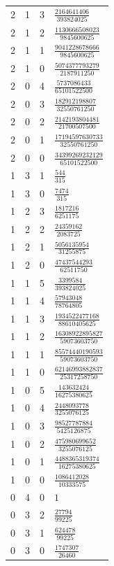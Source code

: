\begin{longtable}{rrrl}
2 & 1 & 3 & $\frac{2164641406}{393824025}$\\
2 & 1 & 2 & $\frac{1130666508023}{9845600625}$\\
2 & 1 & 1 & $\frac{9041228678666}{9845600625}$\\
2 & 1 & 0 & $\frac{5074377793279}{2187911250}$\\
2 & 0 & 4 & $\frac{5737086433}{65101522500}$\\
2 & 0 & 3 & $\frac{182912198807}{32550761250}$\\
2 & 0 & 2 & $\frac{2142193804481}{21700507500}$\\
2 & 0 & 1 & $\frac{17194597630733}{32550761250}$\\
2 & 0 & 0 & $\frac{34399269232129}{65101522500}$\\
1 & 3 & 1 & $\frac{544}{315}$\\
1 & 3 & 0 & $\frac{7474}{315}$\\
1 & 2 & 3 & $\frac{1817216}{6251175}$\\
1 & 2 & 2 & $\frac{24359162}{2083725}$\\
1 & 2 & 1 & $\frac{5056135954}{31255875}$\\
1 & 2 & 0 & $\frac{47437544293}{62511750}$\\
1 & 1 & 5 & $\frac{3399584}{393824025}$\\
1 & 1 & 4 & $\frac{57943048}{78764805}$\\
1 & 1 & 3 & $\frac{1934522477168}{88610405625}$\\
1 & 1 & 2 & $\frac{16308922895827}{59073603750}$\\
1 & 1 & 1 & $\frac{85574440190593}{59073603750}$\\
1 & 1 & 0 & $\frac{62146993882837}{25317258750}$\\
1 & 0 & 5 & $\frac{143632424}{16275380625}$\\
1 & 0 & 4 & $\frac{2448093778}{3255076125}$\\
1 & 0 & 3 & $\frac{98527787884}{5425126875}$\\
1 & 0 & 2 & $\frac{475980699652}{3255076125}$\\
1 & 0 & 1 & $\frac{4488365319374}{16275380625}$\\
1 & 0 & 0 & $\frac{1086412028}{10333575}$\\
0 & 4 & 0 & $1$\\
0 & 3 & 2 & $\frac{27794}{99225}$\\
0 & 3 & 1 & $\frac{624478}{99225}$\\
0 & 3 & 0 & $\frac{1747307}{26460}$\\

\end{longtable}
